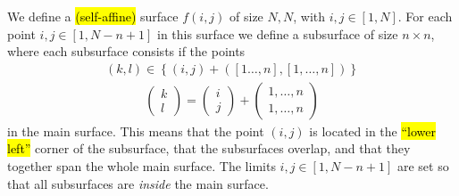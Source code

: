 We define a \hl{(self-affine)} surface $f(i,j)$ of size $N,N$, with $i,j \in [1,N]$. For each point $i,j \in [1,N-n+1]$ in this surface we define a subsurface of size $n\times n$, where each subsurface consists if the points
\begin{align*}
    (k,l) \in \left\{ (i,j) + \left([1\dots,n], [1,\dots,n]\right)\right\}
\end{align*}
\begin{align*}
    \begin{pmatrix}
        k \\
        l
    \end{pmatrix}
    =
    \begin{pmatrix}
        i \\
        j
    \end{pmatrix}
    +
    \begin{pmatrix}
        1,\dots,n \\
        1,\dots,n
    \end{pmatrix}
\end{align*}%
%
in the main surface. This means that the point $(i,j)$ is located in the \hl{``lower left''} corner of the subsurface, that the subsurfaces overlap, and that they together span the whole main surface. The limits $i,j \in [1,N-n+1]$ are set so that all subsurfaces are \emph{inside} the main surface.

